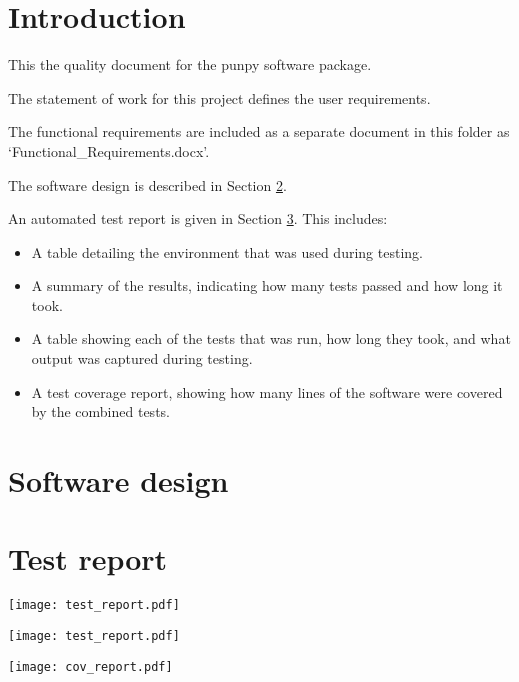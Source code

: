 \documentclass{article}
\begin{document}

\tableofcontents



\clearpage
\pagestyle{long}


\graphicspath{{images/}}

\section{Introduction}\label{introduction}

This the quality document for the punpy software package.


The statement of work for this project defines the user requirements.

The functional requirements are included as a separate document in this folder as `Functional\_Requirements.docx'.

The software design is described in Section \ref{design}.

An automated test report is given in Section \ref{testreport}. This includes:
\begin{itemize}
\item A table detailing the environment that was used during testing.
\item A summary of the results, indicating how many tests passed and how long it took.
\item A table showing each of the tests that was run, how long they took, and what output was captured during testing.
\item A test coverage report, showing how many lines of the software were covered by the combined tests.
\end{itemize}

\clearpage
\section{Software design}\label{design}



\clearpage
\section{Test report}\label{testreport}

\texttt{[image: test\_report.pdf]}

\texttt{[image: test\_report.pdf]}


\texttt{[image: cov\_report.pdf]}



\end{document}
